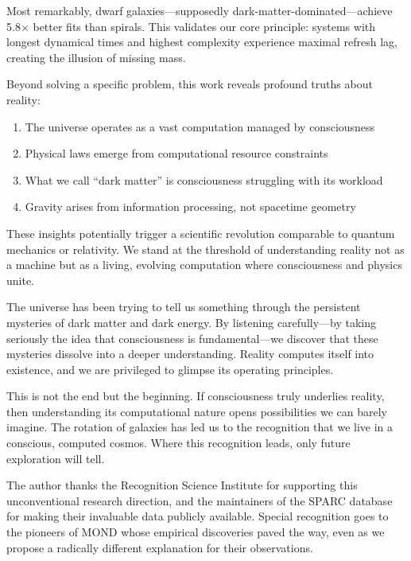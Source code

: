 \documentclass[twocolumn,prd,amsmath,amssymb,aps,superscriptaddress,nofootinbib]{revtex4-2}
\begin{document}
Most remarkably, dwarf galaxies---supposedly dark-matter-dominated---achieve 5.8$\times$ better fits than spirals. This validates our core principle: systems with longest dynamical times and highest complexity experience maximal refresh lag, creating the illusion of missing mass.

Beyond solving a specific problem, this work reveals profound truths about reality:
\begin{enumerate}
\item The universe operates as a vast computation managed by consciousness
\item Physical laws emerge from computational resource constraints
\item What we call ``dark matter'' is consciousness struggling with its workload
\item Gravity arises from information processing, not spacetime geometry
\end{enumerate}

These insights potentially trigger a scientific revolution comparable to quantum mechanics or relativity. We stand at the threshold of understanding reality not as a machine but as a living, evolving computation where consciousness and physics unite.

The universe has been trying to tell us something through the persistent mysteries of dark matter and dark energy. By listening carefully---by taking seriously the idea that consciousness is fundamental---we discover that these mysteries dissolve into a deeper understanding. Reality computes itself into existence, and we are privileged to glimpse its operating principles.

This is not the end but the beginning. If consciousness truly underlies reality, then understanding its computational nature opens possibilities we can barely imagine. The rotation of galaxies has led us to the recognition that we live in a conscious, computed cosmos. Where this recognition leads, only future exploration will tell.

\acknowledgments

The author thanks the Recognition Science Institute for supporting this unconventional research direction, and the maintainers of the SPARC database for making their invaluable data publicly available. Special recognition goes to the pioneers of MOND whose empirical discoveries paved the way, even as we propose a radically different explanation for their observations.
\end{document}
